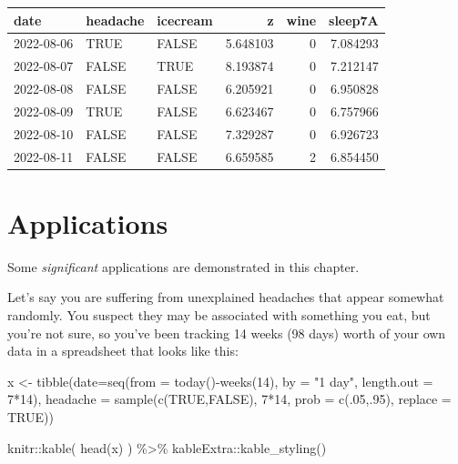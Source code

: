 \documentclass[
]{book}
\newenvironment{Shaded}{\begin{snugshade}}{\end{snugshade}}
\newcommand{\AttributeTok}[1]{\textcolor[rgb]{0.77,0.63,0.00}{#1}}
\newcommand{\ConstantTok}[1]{\textcolor[rgb]{0.00,0.00,0.00}{#1}}
\newcommand{\DecValTok}[1]{\textcolor[rgb]{0.00,0.00,0.81}{#1}}
\newcommand{\FunctionTok}[1]{\textcolor[rgb]{0.00,0.00,0.00}{#1}}
\newcommand{\NormalTok}[1]{#1}
\newcommand{\OtherTok}[1]{\textcolor[rgb]{0.56,0.35,0.01}{#1}}
\newcommand{\SpecialCharTok}[1]{\textcolor[rgb]{0.00,0.00,0.00}{#1}}
\newcommand{\StringTok}[1]{\textcolor[rgb]{0.31,0.60,0.02}{#1}}
\begin{document}
\begin{tabular}{l|l|l|r|r|r}
\hline
date & headache & icecream & z & wine & sleep7A\\
\hline
2022-08-06 & TRUE & FALSE & 5.648103 & 0 & 7.084293\\
\hline
2022-08-07 & FALSE & TRUE & 8.193874 & 0 & 7.212147\\
\hline
2022-08-08 & FALSE & FALSE & 6.205921 & 0 & 6.950828\\
\hline
2022-08-09 & TRUE & FALSE & 6.623467 & 0 & 6.757966\\
\hline
2022-08-10 & FALSE & FALSE & 7.329287 & 0 & 6.926723\\
\hline
2022-08-11 & FALSE & FALSE & 6.659585 & 2 & 6.854450\\
\hline
\end{tabular}

\hypertarget{applications}{%
\chapter{Applications}\label{applications}}

Some \emph{significant} applications are demonstrated in this chapter.

Let's say you are suffering from unexplained headaches that appear somewhat randomly. You suspect they may be associated with something you eat, but you're not sure, so you've been tracking 14 weeks (98 days) worth of your own data in a spreadsheet that looks like this:

\begin{Shaded}
\begin{Highlighting}[]
\NormalTok{x }\OtherTok{\textless{}{-}} \FunctionTok{tibble}\NormalTok{(}\AttributeTok{date=}\FunctionTok{seq}\NormalTok{(}\AttributeTok{from =} \FunctionTok{today}\NormalTok{()}\SpecialCharTok{{-}}\FunctionTok{weeks}\NormalTok{(}\DecValTok{14}\NormalTok{),}
                     \AttributeTok{by =} \StringTok{"1 day"}\NormalTok{, }\AttributeTok{length.out =} \DecValTok{7}\SpecialCharTok{*}\DecValTok{14}\NormalTok{),}
            \AttributeTok{headache =} \FunctionTok{sample}\NormalTok{(}\FunctionTok{c}\NormalTok{(}\ConstantTok{TRUE}\NormalTok{,}\ConstantTok{FALSE}\NormalTok{), }\DecValTok{7}\SpecialCharTok{*}\DecValTok{14}\NormalTok{,}
                              \AttributeTok{prob =} \FunctionTok{c}\NormalTok{(.}\DecValTok{05}\NormalTok{,.}\DecValTok{95}\NormalTok{),}
                              \AttributeTok{replace =} \ConstantTok{TRUE}\NormalTok{))}

\NormalTok{knitr}\SpecialCharTok{::}\FunctionTok{kable}\NormalTok{( }\FunctionTok{head}\NormalTok{(x) ) }\SpecialCharTok{\%\textgreater{}\%}\NormalTok{ kableExtra}\SpecialCharTok{::}\FunctionTok{kable\_styling}\NormalTok{()}
\end{Highlighting}
\end{Shaded}
\end{document}
